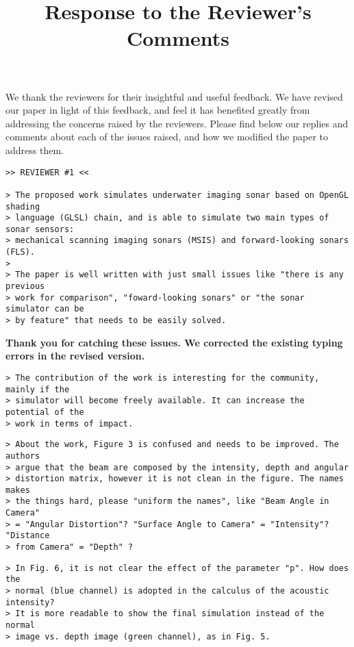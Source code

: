 \documentclass{article}
\title{Response to the Reviewer's Comments}
\begin{document}
\maketitle

We thank the reviewers for their insightful and useful feedback. We have
revised our paper in light of this feedback, and feel it has benefited
greatly from addressing the concerns raised by the reviewers. Please find
below our replies and comments about each of the issues raised, and how
we modified the paper to address them.

\begin{verbatim}
>> REVIEWER #1 <<

> The proposed work simulates underwater imaging sonar based on OpenGL shading
> language (GLSL) chain, and is able to simulate two main types of sonar sensors:
> mechanical scanning imaging sonars (MSIS) and forward-looking sonars (FLS).
>
> The paper is well written with just small issues like "there is any previous
> work for comparison", "foward-looking sonars" or "the sonar simulator can be
> by feature" that needs to be easily solved.
\end{verbatim}

\textbf{Thank you for catching these issues. We corrected the existing typing
errors in the revised version.}

\begin{verbatim}
> The contribution of the work is interesting for the community, mainly if the
> simulator will become freely available. It can increase the potential of the
> work in terms of impact.
\end{verbatim}


\begin{verbatim}
> About the work, Figure 3 is confused and needs to be improved. The authors
> argue that the beam are composed by the intensity, depth and angular
> distortion matrix, however it is not clean in the figure. The names makes
> the things hard, please "uniform the names", like "Beam Angle in Camera"
> = "Angular Distortion"? "Surface Angle to Camera" = "Intensity"? "Distance
> from Camera" = "Depth" ?
\end{verbatim}


\begin{verbatim}
> In Fig. 6, it is not clear the effect of the parameter "p". How does the
> normal (blue channel) is adopted in the calculus of the acoustic intensity?
> It is more readable to show the final simulation instead of the normal
> image vs. depth image (green channel), as in Fig. 5.
\end{verbatim}
\end{document}
